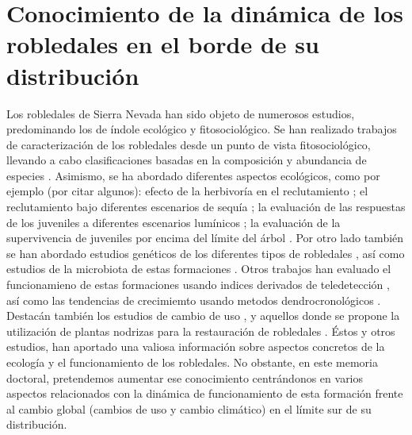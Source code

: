 \section{Conocimiento de la dinámica de los robledales en el borde de su distribución}\label{sec:intro:conocimiento}

Los robledales de Sierra Nevada han sido objeto de numerosos estudios, predominando los de índole ecológico y fitosociológico. Se han realizado trabajos de caracterización de los robledales desde un punto de vista fitosociológico, llevando a cabo clasificaciones basadas en la composición y abundancia de especies \autocites[\emph{e.g.}][]{MartinezParrasMoleroMesa1982EcologiaFitosociologia,Loriteetal2008PhytosociologicalReview, MelendoValle2000EstudioComparativo}. Asimismo, se ha abordado diferentes aspectos ecológicos, como por ejemplo (por citar algunos): efecto de la herbivoría en el reclutamiento \autocites[\emph{e.g.}][]{Gomez2003ImpactVertebrate,Barazaetal2004HerbivoryHas,Barazaetal2007InfluenciaCaracteristicas}; el reclutamiento bajo diferentes escenarios de sequía \autocites{Mendozaetal2009SeedingExperiment}; la evaluación de las respuestas de los juveniles a diferentes escenarios lumínicos \autocite{GomezAparicioetal2008OakSeedling}; la evaluación de la supervivencia de juveniles por encima del límite del árbol \autocites{Leverkusetal2015RestoringPresent}. Por otro lado también se han abordado estudios genéticos de los diferentes tipos de robledales \autocites[\emph{e.g.}][]{ValbuenaCarabanaGil2011EvaluacionEstructura,ValbuenaCarabanaGil2013GeneticResilience,ValbuenaCarabanaGil2017CentenaryCoppicing}, así como estudios de la microbiota de estas formaciones \autocites{CoboDiazetal2017TaxonomicFunctional,Lasaetal2019BacteriaEndosphere, Lasaetal2019MetabarcodingReveals}. Otros trabajos han evaluado el funcionamieno de estas formaciones usando indices derivados de teledetección \autocites{Dionisioetal2012IPoGEC,AlcarazSeguraetal2015CambiosProductividad,RequenaMulloretal2018AssessmentEcosystem}, así como las tendencias de crecimiemto usando metodos dendrocronológicos  \autocites{GeaIzquierdoCanellas2014LocalClimate,RubioCuadradoetal2018AbioticFactors}. Destacán también los estudios de cambio de uso \autocite{JimenezOlivenciaetal2015EvolucionUsos,CamachoOlmedoetal2002DinamicaEvolutiva}, y aquellos donde se propone la utilización de plantas nodrizas para la restauración de robledales \autocites{Castroetal2006RestoringQuercus,GomezAparicioetal2004ApplyingPlant}. 
Éstos y otros estudios, han aportado una valiosa información sobre aspectos concretos de la ecología y el funcionamiento de los robledales. No obstante, en este memoria doctoral, pretendemos aumentar ese conocimiento centrándonos en varios aspectos relacionados con la dinámica de funcionamiento de esta formación frente al cambio global (cambios de uso y cambio climático) en el límite sur de su distribución.    

